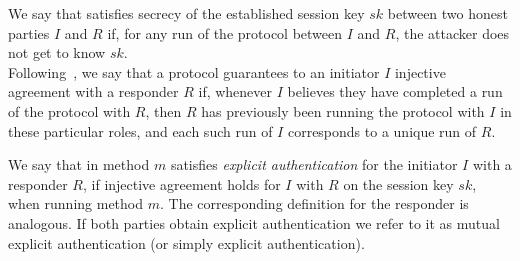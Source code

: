  
We say that \mEdhoc{} satisfies secrecy of the established session key $sk$
between two honest parties $I$ and $R$ if, for any run of the protocol between $I$ and
$R$, the attacker does not get to know $sk$.\\
%

 
\label{sec:authenticationDef}
Following~\cite{DBLP:conf/csfw/Lowe97a}, we say that a protocol guarantees to an
initiator $I$ injective agreement with a responder $R$ if, whenever $I$ believes
they have completed a run of the protocol with $R$, then $R$ has previously been
running the protocol with $I$ in these particular roles, and each such run of
$I$ corresponds to a unique run of $R$.

%
We say that \mEdhoc{} in method $m$ satisfies \emph{explicit authentication} for
the initiator $I$ with a responder $R$, if injective agreement holds for $I$
with $R$ on the session key $sk$, when running method $m$.
%
The corresponding definition for the responder is analogous.
%
If both parties obtain explicit authentication we refer to it as mutual explicit
authentication (or simply explicit authentication).

